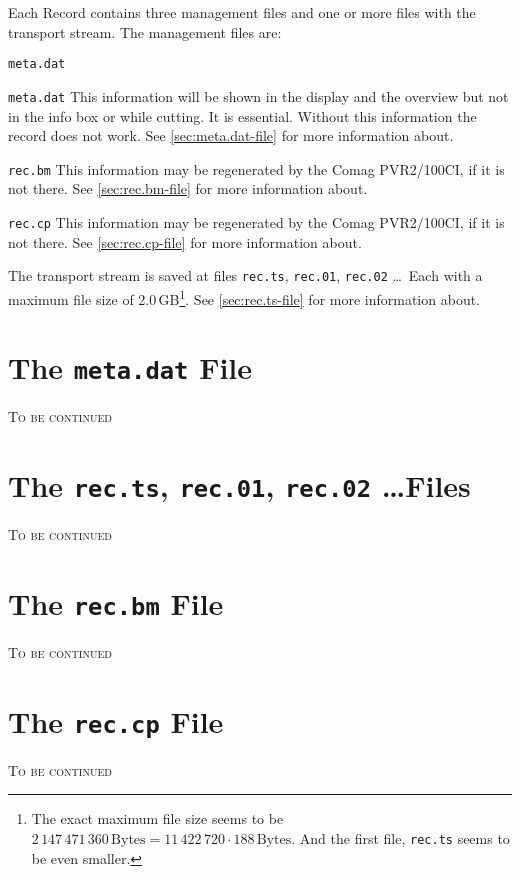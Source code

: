 \documentclass{scrartcl}
\newcommand*{\Comag}{Comag PVR2/100CI\xspace}
\begin{document}
Each Record contains three management files and one or more files with the
transport stream. The management files are:
\begin{labeling}[:]{\texttt{meta.dat}}
\item [\texttt{meta.dat}] This information will be shown in the display and
  the overview but not in the info box or while cutting. It is
  essential. Without this information the record does not work. See
  \autoref{sec:meta.dat-file} for more information about.
\item [\texttt{rec.bm}] This information may be regenerated by the \Comag, if
  it is not there. See \autoref{sec:rec.bm-file} for more information about.
\item [\texttt{rec.cp}] This information may be regenerated by the \Comag, if
  it is not there. See \autoref{sec:rec.cp-file} for more information about.
\end{labeling}

The transport stream is saved at files \texttt{rec.ts}, \texttt{rec.01},
\texttt{rec.02} \dots\@\ Each with a maximum file size of 2.0\,GB\footnote{The
  exact maximum file size seems to be $2\,147\,471\,360\,\textrm{Bytes} =
  11\,422\,720 \cdot 188\,\textrm{Bytes}$. And the first file, \texttt{rec.ts}
  seems to be even smaller.}. See \autoref{sec:rec.ts-file} for more
information about.

\section{The \texttt{meta.dat} File}
\label{sec:meta.dat-file}

\textsc{To be continued}

\section{The \texttt{rec.ts}, \texttt{rec.01}, \texttt{rec.02} \dots Files}
\label{sec:rec.ts-file}

\textsc{To be continued}

\section{The \texttt{rec.bm} File}
\label{sec:rec.bm-file}

\textsc{To be continued}

\section{The \texttt{rec.cp} File}
\label{sec:rec.cp-file}

\textsc{To be continued}
\end{document}
